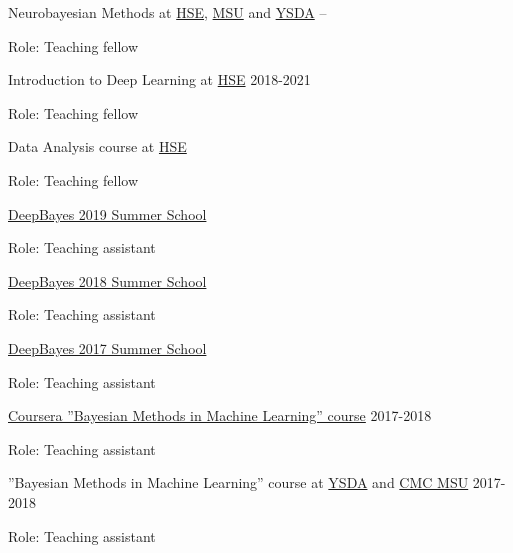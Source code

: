 \documentclass[letterpaper,MMMyyyy,nonstopmode]{simpleresumecv}
\begin{document}
\begin{Body}
\BulletItem
Neurobayesian Methods at \href{https://cs.hse.ru/en/}{HSE}, \href{https://cs.msu.ru/en}{MSU} and \href{https://yandexdataschool.com}{YSDA}
\hfill
{} --
\begin{Detail}
\Item
Role: Teaching fellow
\end{Detail}

\BulletItem
Introduction to Deep Learning at \href{https://cs.hse.ru/en/}{HSE}
\hfill
2018-2021
\begin{Detail}
\Item
Role: Teaching fellow
\end{Detail}

\BulletItem
Data Analysis course at \href{https://cs.hse.ru/en/}{HSE}
\hfill
{}
\begin{Detail}
\Item
Role: Teaching fellow
\end{Detail}

\BulletItem
\href{http://deepbayes.ru}{DeepBayes 2019 Summer School}
\hfill
{}
\begin{Detail}
\Item
Role: Teaching assistant
\end{Detail}

\BulletItem
\href{http://deepbayes.ru/2018/}{DeepBayes 2018 Summer School}
\hfill
{}
\begin{Detail}
\Item
Role: Teaching assistant
\end{Detail}

\BulletItem
\href{http://deepbayes.ru/2017/}{DeepBayes 2017 Summer School}
\hfill
{}
\begin{Detail}
\Item
Role: Teaching assistant
\end{Detail}

\Gap

\BulletItem
\href{https://www.coursera.org/learn/bayesian-methods-in-machine-learning}
{Coursera ”Bayesian Methods in Machine Learning” course}
\hfill
2017-2018
\begin{Detail}
\Item
Role: Teaching assistant
\end{Detail}

\Gap

\BulletItem
”Bayesian Methods in Machine Learning” course at \href{https://yandexdataschool.com}{YSDA}
and \href{https://cs.msu.ru/en}{CMC MSU}
\hfill
2017-2018
\begin{Detail}
\Item
Role: Teaching assistant
\end{Detail}

\Gap


\end{Body}
\end{document}
